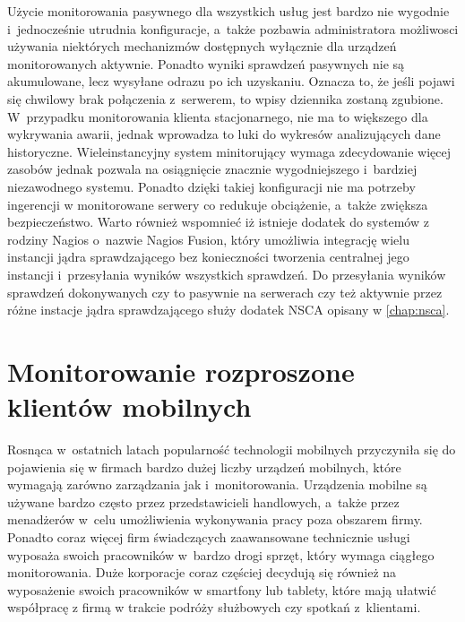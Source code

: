 
Użycie monitorowania pasywnego dla wszystkich usług jest bardzo nie
wygodnie i~jednocześnie utrudnia konfiguracje, a~także pozbawia
administratora możliwosci używania niektórych mechanizmów dostępnych
wyłącznie dla urządzeń monitorowanych aktywnie. Ponadto wyniki
sprawdzeń pasywnych nie są akumulowane, lecz wysyłane odrazu po ich
uzyskaniu. Oznacza to, że jeśli pojawi się chwilowy brak połączenia
z~serwerem, to wpisy dziennika zostaną zgubione. W~przypadku
monitorowania klienta stacjonarnego, nie ma to większego dla
wykrywania awarii, jednak wprowadza to luki do wykresów analizujących
dane historyczne. Wieleinstancyjny system minitorujący wymaga
zdecydowanie więcej zasobów jednak pozwala na osiągnięcie znacznie
wygodniejszego i~bardziej niezawodnego systemu. Ponadto dzięki takiej
konfiguracji nie ma potrzeby ingerencji w monitorowane serwery co
redukuje obciążenie, a~także zwiększa bezpieczeństwo. Warto również
wspomnieć iż istnieje dodatek do systemów z rodziny Nagios o~nazwie
Nagios Fusion, który umożliwia integrację wielu instancji jądra
sprawdzającego bez konieczności tworzenia centralnej jego instancji
i~przesyłania wyników wszystkich sprawdzeń. Do przesyłania wyników
sprawdzeń dokonywanych czy to pasywnie na serwerach czy też aktywnie
przez różne instacje jądra sprawdzającego służy dodatek NSCA opisany w
\ref{chap:nsca}.

\section[Monitorowanie rozproszone][Monitorowanie rozproszone klientów
mobilnych]{Monitorowanie rozproszone klientów mobilnych}


Rosnąca w~ostatnich latach popularność technologii mobilnych
przyczyniła się do pojawienia się w firmach bardzo dużej liczby
urządzeń mobilnych, które wymagają zarówno zarządzania jak
i~monitorowania. Urządzenia mobilne są używane bardzo często przez
przedstawicieli handlowych, a~także przez menadżerów w~celu
umożliwienia wykonywania pracy poza obszarem firmy. Ponadto coraz
więcej firm świadczących zaawansowane technicznie usługi wyposaża
swoich pracowników w~bardzo drogi sprzęt, który wymaga ciągłego
monitorowania. Duże korporacje coraz częściej decydują się również na
wyposażenie swoich pracowników w smartfony lub tablety, które mają
ułatwić współpracę z firmą w trakcie podróży służbowych czy spotkań
z~klientami.

